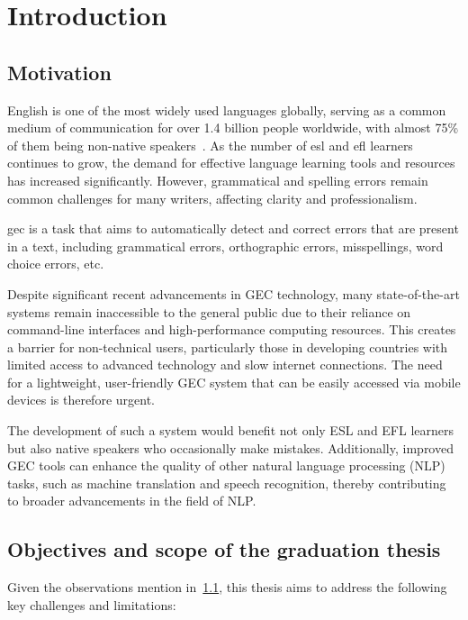 \chapter{Introduction}

\section{Motivation}
\label{section:motivation}

English is one of the most widely used languages globally, serving as a common medium of communication for over 1.4 billion people worldwide, with almost 75\% of them being non-native speakers~\citep{eberhard2015ethnologue}.
As the number of \acrfull{esl} and \acrfull{efl} learners continues to grow, the demand for effective language learning tools and resources has increased significantly.
However, grammatical and spelling errors remain common challenges for many writers, affecting clarity and professionalism.

\acrfull{gec} is a task that aims to automatically detect and correct errors that are present in a text, including grammatical errors, orthographic errors, misspellings, word choice errors, etc. \citep{ng-etal-2014-conll}

Despite significant recent advancements in GEC technology, many state-of-the-art systems remain inaccessible to the general public due to their reliance on command-line interfaces and high-performance computing resources.
This creates a barrier for non-technical users, particularly those in developing countries with limited access to advanced technology and slow internet connections.
The need for a lightweight, user-friendly GEC system that can be easily accessed via mobile devices is therefore urgent.

The development of such a system would benefit not only ESL and EFL learners but also native speakers who occasionally make mistakes.
Additionally, improved GEC tools can enhance the quality of other natural language processing (NLP) tasks, such as machine translation and speech recognition, thereby contributing to broader advancements in the field of NLP.

\section{Objectives and scope of the graduation thesis}
\label{section:objective}
Given the observations mention in~\ref{section:motivation}, this thesis aims to address the following key challenges and limitations:

